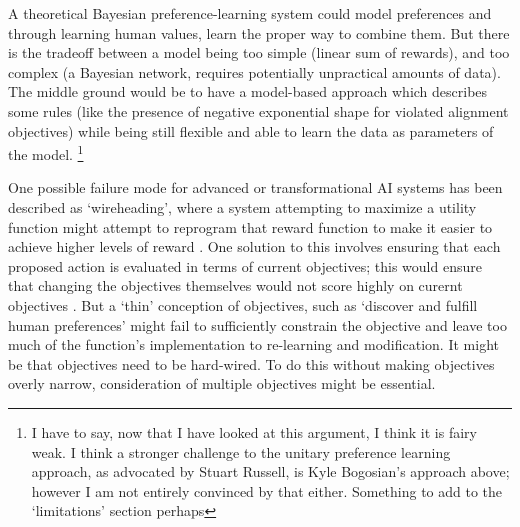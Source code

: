 A theoretical Bayesian preference-learning system could model preferences and through learning human values, learn the proper way to combine them. But there is the tradeoff between a model being too simple (linear sum of rewards), and too complex (a Bayesian network, requires potentially unpractical amounts of data). The middle ground would be to have a model-based approach which describes some rules (like the presence of negative exponential shape for violated alignment objectives) while being still flexible and able to learn the data as parameters of the model.
\footnote{I have to say, now that I have looked at this argument, I think it is fairy weak. I think a stronger challenge to the unitary preference learning approach, as advocated by Stuart Russell, is Kyle Bogosian's approach above; however I am not entirely convinced by that either. Something to add to the `limitations' section perhaps}

One possible failure mode for advanced or transformational AI systems has been described as `wireheading', where a system attempting to maximize a utility function might attempt to reprogram that reward function to make it easier to achieve higher levels of reward \cite{demski_a_stable_2017}. One solution to this involves ensuring that each proposed action is evaluated in terms of current objectives; this would ensure that changing the objectives themselves would not score highly on curernt objectives \cite{dewey_learning_2011}. But a `thin' conception of objectives, such as `discover and fulfill human preferences' might fail to sufficiently constrain the objective and leave too much of the function's implementation to re-learning and modification. It might be that objectives need to be hard-wired. To do this without making objectives overly narrow, consideration of multiple objectives might be essential.




